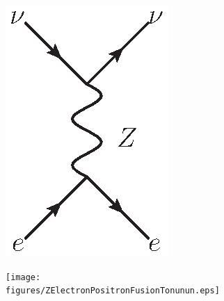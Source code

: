 \begin{figure}[!htbp]
    \centering
    \begin{subfigure}[b]{0.25\textwidth}
        \includegraphics[width=\linewidth,scale=0.5]{figures/ZElectronNeutrinoScatter.eps}
        \caption{}
        \label{fig:WeakScatter}
    \end{subfigure}%
    \begin{subfigure}[b]{0.5\textwidth}
        \texttt{[image: figures/ZElectronPositronFusionTonunun.eps]}
        \caption{}
        \label{fig:WeakFusion}
    \end{subfigure}%
    \begin{subfigure}[b]{0.3\textwidth}

\end{subfigure}
\end{figure}
